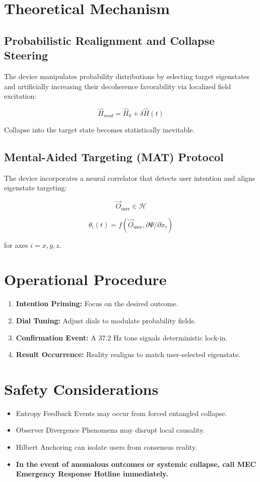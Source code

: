 \documentclass[12pt]{article}
\begin{document}
\section{Theoretical Mechanism}

\subsection{Probabilistic Realignment and Collapse Steering}
The device manipulates probability distributions by selecting target eigenstates and artificially increasing their decoherence favorability via localized field excitation:

\[
\hat{H}_{mod} = \hat{H}_0 + \delta \hat{H}(t)
\]

Collapse into the target state becomes statistically inevitable.

\subsection{Mental-Aided Targeting (MAT) Protocol}
The device incorporates a neural correlator that detects user intention and aligns eigenstate targeting:

\[
\vec{O}_{\text{user}} \in \mathcal{H}
\]

\[
\theta_{i}(t) = f(\vec{O}_{\text{user}}, \partial \Psi / \partial x_i)
\]

for axes $i = x, y, z$.

\section{Operational Procedure}

\begin{enumerate}
    \item \textbf{Intention Priming:} Focus on the desired outcome.
    \item \textbf{Dial Tuning:} Adjust dials to modulate probability fields.
    \item \textbf{Confirmation Event:} A 37.2 Hz tone signals deterministic lock-in.
    \item \textbf{Result Occurrence:} Reality realigns to match user-selected eigenstate.
\end{enumerate}

\section{Safety Considerations}

\begin{itemize}
    \item Entropy Feedback Events may occur from forced entangled collapse.
    \item Observer Divergence Phenomena may disrupt local causality.
    \item Hilbert Anchoring can isolate users from consensus reality.
    \item \textbf{In the event of anomalous outcomes or systemic collapse, call MEC Emergency Response Hotline immediately.}
\end{itemize}
\end{document}
